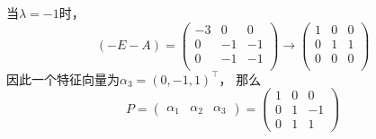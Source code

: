 \begin{solution}
    当$\lambda = -1$时，
    \[
        (-E-A) =
        \begin{pmatrix}
            -3 & 0  & 0  \\
            0  & -1 & -1 \\
            0  & -1 & -1 \\
        \end{pmatrix}
        \longrightarrow
        \begin{pmatrix}
            1 & 0 & 0 \\
            0 & 1 & 1 \\
            0 & 0 & 0 \\
        \end{pmatrix}
    \]
    因此一个特征向量为$\alpha_3 = (0,-1,1)^\intercal$，
    那么
    \[
        P =
        \begin{pmatrix}
            \alpha_1 & \alpha_2 & \alpha_3
        \end{pmatrix}
        =
        \begin{pmatrix}
            1 & 0 & 0  \\
            0 & 1 & -1 \\
            0 & 1 & 1
        \end{pmatrix}
    \]
\end{solution}

